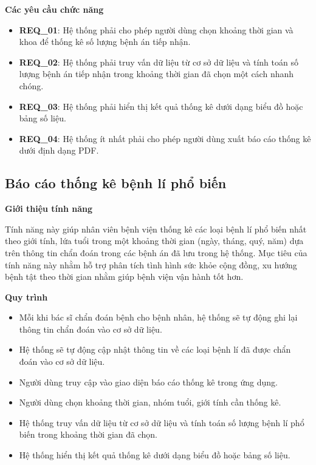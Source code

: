 \noindent \textbf{Các yêu cầu chức năng}

\begin{itemize}
  \item \textbf{REQ\_01}: Hệ thống phải cho phép người dùng chọn khoảng thời gian và khoa để thống kê số lượng bệnh án tiếp nhận.
  \item \textbf{REQ\_02}: Hệ thống phải truy vấn dữ liệu từ cơ sở dữ liệu và tính toán số lượng bệnh án tiếp nhận trong khoảng thời gian đã chọn một cách nhanh chóng.
  \item \textbf{REQ\_03}: Hệ thống phải hiển thị kết quả thống kê dưới dạng biểu đồ hoặc bảng số liệu.
  \item \textbf{REQ\_04}: Hệ thống ít nhất phải cho phép người dùng xuất báo cáo thống kê dưới định dạng PDF.
\end{itemize}

\subsection{Báo cáo thống kê bệnh lí phổ biến}

\noindent \textbf{Giới thiệu tính năng}

Tính năng này giúp nhân viên bệnh viện thống kê các loại bệnh lí phổ biến nhất theo giới tính, lứa tuổi trong một khoảng thời gian (ngày, tháng, quý, năm) dựa trên thông tin chẩn đoán trong các bệnh án đã lưu trong hệ thống. Mục tiêu của tính năng này nhằm hỗ trợ phân tích tình hình sức khỏe cộng đồng, xu hướng bệnh tật theo thời gian nhằm giúp bệnh viện vận hành tốt hơn.

\noindent \textbf{Quy trình}

\begin{itemize}
  \item Mỗi khi bác sĩ chẩn đoán bệnh cho bệnh nhân, hệ thống sẽ tự động ghi lại thông tin chẩn đoán vào cơ sở dữ liệu.
  \item Hệ thống sẽ tự động cập nhật thông tin về các loại bệnh lí đã được chẩn đoán vào cơ sở dữ liệu.
  \item Người dùng truy cập vào giao diện báo cáo thống kê trong ứng dụng.
  \item Người dùng chọn khoảng thời gian, nhóm tuổi, giới tính cần thống kê.
  \item Hệ thống truy vấn dữ liệu từ cơ sở dữ liệu và tính toán số lượng bệnh lí phổ biến trong khoảng thời gian đã chọn.
  \item Hệ thống hiển thị kết quả thống kê dưới dạng biểu đồ hoặc bảng số liệu.
\end{itemize}

